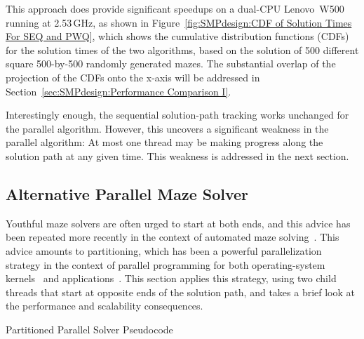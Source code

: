 This approach does provide significant speedups on a dual-CPU
Lenovo\mytexttrademark\ W500
running at 2.53\,GHz, as shown in
Figure~\ref{fig:SMPdesign:CDF of Solution Times For SEQ and PWQ},
which shows the cumulative distribution functions (CDFs) for the solution
times of the two algorithms, based on the solution of 500 different square
500-by-500 randomly generated mazes.
The substantial overlap
of the projection of the CDFs onto the x-axis will be addressed in
Section~\ref{sec:SMPdesign:Performance Comparison I}.

Interestingly enough, the sequential solution-path tracking works unchanged
for the parallel algorithm.
However, this uncovers a significant weakness in the parallel algorithm:
At most one thread may be making progress along the solution path at
any given time.
This weakness is addressed in the next section.

\subsection{Alternative Parallel Maze Solver}
\label{sec:SMPdesign:Alternative Parallel Maze Solver}

Youthful maze solvers are often urged to start at both ends, and
this advice has been repeated more recently in the context of automated
maze solving~\cite{UMD:CMSC433maze}.
This advice amounts to partitioning, which has been a powerful
parallelization strategy
in the context of parallel programming for both operating-system
kernels~\cite{Beck85,Inman85} and
applications~\cite{DavidAPatterson2010TroubleMulticore}.
This section applies this strategy, using two child threads that start
at opposite ends of the solution path, and takes a brief look at the
performance and scalability consequences.

\begin{listing}[tbp]
\begin{fcvlabel}
\end{fcvlabel}
\caption{Partitioned Parallel Solver Pseudocode}
\label{lst:SMPdesign:Partitioned Parallel Solver Pseudocode}
\end{listing}

